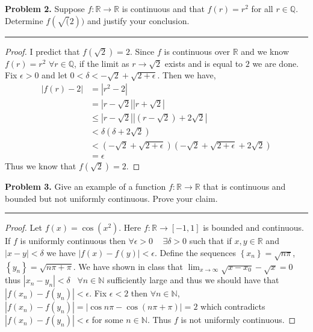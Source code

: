 \documentclass[leqno]{article}
\theoremstyle{nonumberplain}
\newtheorem{proof}{Proof}
\begin{document}
\noindent\textbf{Problem 2.} Suppose $f \colon \mathbb{R} \to \mathbb{R}$ is continuous and that $f(r) = r^2$ for all $r \in \mathbb{Q}$.  Determine $f(\sqrt(2))$ and justify your conclusion.

\noindent\rule[0.5ex]{\linewidth}{1pt}

\begin{proof}
	I predict that $f(\sqrt{2})=2$.  Since $f$ is continuous over $\mathbb{R}$ and we know $f(r)=r^2$ $\forall r\in \mathbb{Q}$, if the limit as $r \to \sqrt{2}$ exists and is equal to $2$ we are done.  Fix $\epsilon >0$ and let $0<\delta < -\sqrt{2}+\sqrt{2+\epsilon}$.  Then we have,
	\begin{align*}
		|f(r)-2|&=|r^2-2|\\
		&= |r-\sqrt{2}||r+\sqrt{2}|\\
		&\leq |r-\sqrt{2}| |(r-\sqrt{2})+2 \sqrt{2}|\\
		&< \delta(\delta + 2\sqrt{2})\\
		&<(-\sqrt{2}+\sqrt{2+\epsilon})(-\sqrt{2}+\sqrt{2+\epsilon}+2\sqrt{2})\\
		&=\epsilon
	\end{align*}
	Thus we know that $f(\sqrt{2})=2$.
\end{proof}

\pagebreak




\noindent\textbf{Problem 3.} Give an example of a function $f \colon \mathbb{R} \to \mathbb{R}$ that is continuous and bounded but not uniformly continuous.  Prove your claim.

\noindent\rule[0.5ex]{\linewidth}{1pt}

\begin{proof}
Let $f(x)=\cos\left(x^2\right)$.  Here $f \colon \mathbb{R} \to [-1,1]$ is bounded and continuous.  If $f$ is uniformly continuous then $\forall \epsilon >0$ ~ $\exists \delta >0$ such that if $x,y \in \mathbb{R}$ and $|x-y|<\delta$ we have $|f(x)-f(y)|<\epsilon$.  Define the sequences $\left\{ x_n \right\} = \sqrt{n\pi}$, $\left\{ y_n \right\} = \sqrt{n \pi + \pi}$.  We have shown in class that $\lim_{x \to \infty} \sqrt{x-x_0} -\sqrt{x}=0$ thus $|x_n - y_n|<\delta$ ~$\forall n\in \mathbb{N}$ sufficiently large and thus we should have that $|f(x_n) - f(y_n)|<\epsilon$.  Fix $\epsilon <2$ then $\forall n \in \mathbb{N}$, ~$|f(x_n)-f(y_n)|=|\cos{n \pi}-\cos{(n \pi +\pi)}|=2$ which contradicts $|f(x_n) - f(y_n)|<\epsilon$ for some $n \in \mathbb{N}$.  Thus $f$ is not uniformly continuous.
\end{proof}
\end{document}
